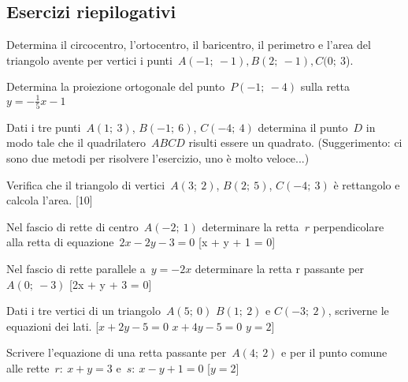 \subsection{Esercizi riepilogativi}

\begin{esercizio}\label{ese:02_01.}
Determina il circocentro, l'ortocentro, il baricentro, il perimetro e l'area 
del triangolo avente per vertici i punti~$A(-1;~-1), B(2;~-1 ), C(0;~3$).  
\end{esercizio}

\begin{esercizio}\label{ese:02_01.}
Determina la proiezione ortogonale del punto~$P(-1;~-4)$ sulla 
retta~$y = - \frac{1}{5} x - 1$ 
\end{esercizio}

\begin{esercizio}\label{ese:02_01.}
Dati i tre punti~$A(1;~3)$, $B(-1;~6)$, $C(-4;~4)$ 
determina il punto~$D$ in modo tale che il quadrilatero~$ABCD$ risulti essere 
un quadrato. 
(Suggerimento: ci sono due metodi per risolvere l'esercizio, uno è molto 
veloce...) 
\end{esercizio}

\begin{esercizio}\label{ese:02_01.}
Verifica che il triangolo di vertici~$A(3;~2)$, $B(2;~5)$, $C(-4;~3)$ è 
rettangolo e calcola l'area. \hfill[10]
\end{esercizio}

\begin{esercizio}\label{ese:02_01.}
Nel fascio di rette di centro~$A(-2;~1)$ determinare la retta~$r$ 
perpendicolare alla retta di equazione~$2x - 2y - 3 = 0$ \hfill[x + y + 1 = 0]
\end{esercizio}

\begin{esercizio}\label{ese:02_01.}
Nel fascio di rette parallele a~$y = -2x$ determinare la retta r 
passante per~$A(0;~-3)$ \hfill[2x + y + 3 = 0]
\end{esercizio}

\begin{esercizio}\label{ese:02_01.}
Dati i tre vertici di un triangolo~$A(5;~0)$ $B(1;~2)$ e $C(-3;~2)$, 
scriverne le equazioni dei lati.
 \hfill[$x + 2y - 5 = 0$  $x + 4 y - 5 = 0$ $y = 2$]
\end{esercizio}

\begin{esercizio}\label{ese:02_01.}
Scrivere l'equazione di una retta passante per~$A(4;~2)$ 
e per il punto comune alle rette~$r:~x + y = 3$ e~$s:~x - y + 1 = 0$
\hfill[$y = 2$]
\end{esercizio}

